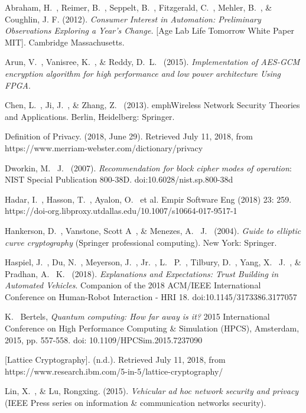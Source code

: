 \documentclass[conference,compsoc]{IEEEtran}
\begin{document}
\begin{thebibliography}{1}

Abraham, H.~, Reimer, B.~, Seppelt, B.~, Fitzgerald, C.~, Mehler, B.~, \& Coughlin, J. F. (2012). \emph{Consumer Interest in Automation: Preliminary Observations Exploring a Year's Change.} [Age Lab Life Tomorrow White Paper MIT]. Cambridge Massachusetts.

Arun, V.~, Vanisree, K.~, \& Reddy, D.~L.~ (2015). \emph{Implementation of AES-GCM encryption algorithm for high performance and low power architecture Using FPGA}.

Chen, L.~, Ji, J.~, \& Zhang, Z.~ (2013). emph{Wireless Network Security Theories and Applications.} Berlin, Heidelberg: Springer.

Definition of Privacy. (2018, June 29). Retrieved July 11, 2018, from https://www.merriam-webster.com/dictionary/privacy

Dworkin, M.~ J.~ (2007). \emph{Recommendation for block cipher modes of operation}: NIST Special Publication 800-38D. doi:10.6028/nist.sp.800-38d

Hadar, I.~, Hasson, T.~, Ayalon, O.~ et al. Empir Software Eng (2018) 23: 259. https://doi-org.libproxy.utdallas.edu/10.1007/s10664-017-9517-1

Hankerson, D.~, Vanstone, Scott A~, \& Menezes, A.~ J.~ (2004). \emph{Guide to elliptic curve cryptography} (Springer professional computing). New York: Springer.

Haspiel, J.~, Du, N.~, Meyerson, J.~, Jr.~, L.~ P.~, Tilbury, D.~, Yang, X.~ J.~, \& Pradhan, A.~ K.~ (2018). \emph{Explanations and Expectations: Trust Building in Automated Vehicles}. Companion of the 2018 ACM/IEEE International Conference on Human-Robot Interaction - HRI 18. doi:10.1145/3173386.3177057

K.~ Bertels, \emph{Quantum computing: How far away is it?} 2015 International Conference on High Performance Computing \& Simulation (HPCS), Amsterdam, 2015, pp. 557-558. doi: 10.1109/HPCSim.2015.7237090

[Lattice Cryptography]. (n.d.). Retrieved July 11, 2018, from https://www.research.ibm.com/5-in-5/lattice-cryptography/

Lin, X.~, \& Lu, Rongxing. (2015). \emph{Vehicular ad hoc network security and privacy} (IEEE Press series on information \& communication networks security).


\end{thebibliography}
\end{document}
